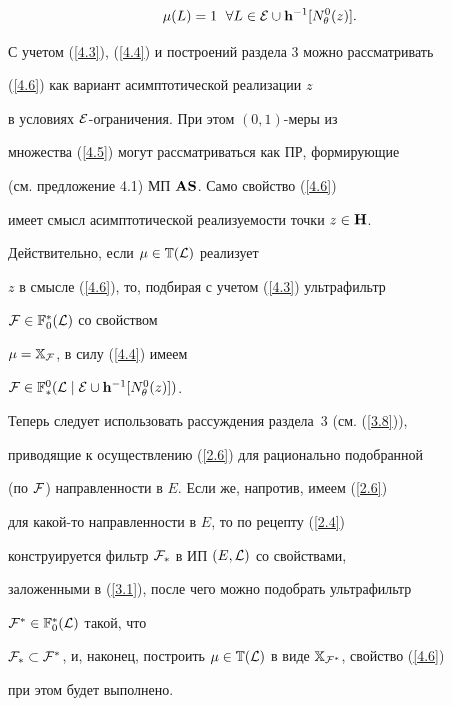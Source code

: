 {\begin{equation}
{{\mu}(L)} = 1\ \; \fo{L} \in {\cal E}\cup{{\bold h}^{-1}}[{N_\theta^0}(z)].


\end{equation}


С учетом (\ref{4.3}), (\ref{4.4}) и построений раздела 3 можно рассматривать


(\ref{4.6}) как вариант асимптотической реализации $z$


в условиях ${\cal E}$-ограничения. При этом $(0,1)$-меры из


множества (\ref{4.5}) могут рассматриваться как ПР, формирующие


(см. предложение 4.1) МП ${\bold A}{\bold S}$. Само свойство (\ref{4.6})


имеет смысл асимптотической реализуемости точки $z \in {\bold H}$.


Действительно, если $\mu \in {{\Bbb T}({\cal L})}$ реализует


$z$ в смысле (\ref{4.6}), то, подбирая с учетом (\ref{4.3}) ультрафильтр


${\cal F} \in {{\Bbb F}_0^*}({\cal L})$ со свойством


$\mu = {{\Bbb X}_{\cal F}}$, в силу (\ref{4.4}) имеем


${\cal F} \in {{\Bbb F}_*^0}({\cal L}\mid{\cal


E}\cup{{\bold h}^{-1}}[{N_\theta^0}(z)])$.


Теперь следует использовать рассуждения раздела~3 (см. (\ref{3.8})),


приводящие к осуществлению (\ref{2.6}) для рационально подобранной


(по ${\cal F}$) направленности в $E$. Если же, напротив, имеем (\ref{2.6})


для какой-то направленности в $E$, то по рецепту (\ref{2.4})


конструируется фильтр ${\cal F}_*$ в ИП $(E,{\cal L})$ со свойствами,


заложенными в (\ref{3.1}), после чего можно подобрать ультрафильтр


${\cal F}^* \in {{\Bbb F}_0^*}({\cal L})$ такой, что


${{\cal F}_*} \subset {{\cal F}^*}$, и, наконец, построить $\mu \in


{{\Bbb T}({\cal L})}$ в виде ${\Bbb X}_{{\cal F}^*}$, свойство (\ref{4.6})


при этом будет выполнено.








}
